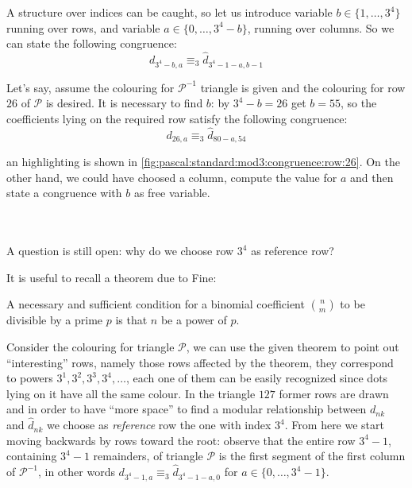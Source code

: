A structure over indices can be caught, so let us introduce variable
$b\in\lbrace1,\ldots,3^{4}\rbrace$ running over rows, and variable
$a\in\lbrace 0,\ldots,3^{4}-b\rbrace$, running over columns. So we can state the following 
congruence:
\begin{equation}
    \label{eq:pascal:arrays:congruence:rows:cols}
    d_{3^4 -b,a} \equiv_{3} \hat{d}_{3^4 -1-a,b-1} 
\end{equation}

Let's say, assume the colouring for $\mathcal{P}^{-1}$ triangle is
given and the colouring for row $26$ of $\mathcal{P}$ is desired. It
is necessary to find $b$: by $3^4 -b=26$ get $b=55$, so the
coefficients lying on the required row satisfy the following congruence:
\begin{displaymath}
        d_{26,a} \equiv_{3} \hat{d}_{80-a,54} 
\end{displaymath}

an highlighting is shown in \autoref{fig:pascal:standard:mod3:congruence:row:26}.
On the other hand, we could have choosed a column, compute the value 
for $a$ and then state a congruence with $b$ as free variable.

\iffalse
\\\\
A question is still open: why do we choose row $3^4$ as reference
row?

It is useful to recall a theorem due to Fine:
\begin{theorem}
  A necessary and sufficient condition for a binomial coefficient
  ${{n} \choose {m}}$ to be divisible by a prime $p$ is that $n$
  be a power of $p$.
\end{theorem}
Consider the colouring for triangle $\mathcal{P}$, we can use the
given theorem to point out ``interesting'' rows, namely those rows
affected by the theorem, they correspond to powers
$3^1, 3^2, 3^3, 3^4, \ldots$, each one of them can be easily
recognized since dots lying on it have all the same colour. In the
triangle $127$ former rows are drawn and in order to have ``more
space'' to find a modular relationship between $d_{nk}$ and
$\hat{d}_{nk}$ we choose as \emph{reference} row the one with
index $3^4$.  From here we start moving backwards by rows toward
the root: observe that the entire row $3^4 -1$, containing
$3^4 -1$ remainders, of triangle $\mathcal{P}$ is the first
segment of the first column of $\mathcal{P}^{-1}$, in other words
$d_{3^4 -1,a} \equiv_{3} \hat{d}_{3^4 -1 -a, 0}$ for
$a \in \lbrace 0, \ldots, 3^4 -1\rbrace$.

